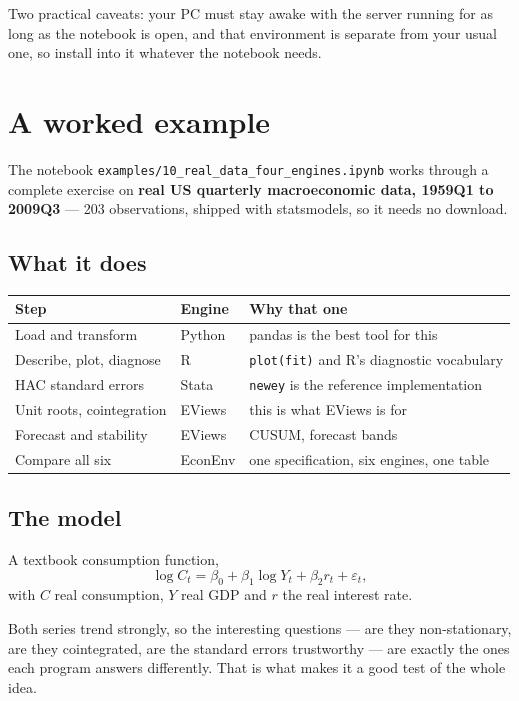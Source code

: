 \documentclass[11pt,a4paper]{report}
\begin{document}
Two practical caveats: your PC must stay awake with the server running for as
long as the notebook is open, and that environment is separate from your usual
one, so install into it whatever the notebook needs.

\chapter{A worked example}

The notebook \texttt{examples/10\_real\_data\_four\_engines.ipynb} works through a
complete exercise on \textbf{real US quarterly macroeconomic data, 1959Q1 to
2009Q3} --- 203 observations, shipped with statsmodels, so it needs no download.

\section{What it does}

\begin{center}
\begin{tabular}{@{}llp{6.2cm}@{}}
\toprule
\textbf{Step} & \textbf{Engine} & \textbf{Why that one} \\
\midrule
Load and transform & Python & pandas is the best tool for this \\
Describe, plot, diagnose & R & \texttt{plot(fit)} and R's diagnostic vocabulary \\
HAC standard errors & Stata & \texttt{newey} is the reference implementation \\
Unit roots, cointegration & EViews & this is what EViews is for \\
Forecast and stability & EViews & CUSUM, forecast bands \\
Compare all six & EconEnv & one specification, six engines, one table \\
\bottomrule
\end{tabular}
\end{center}

\section{The model}

A textbook consumption function,
\[
  \log C_t = \beta_0 + \beta_1 \log Y_t + \beta_2 r_t + \varepsilon_t ,
\]
with $C$ real consumption, $Y$ real GDP and $r$ the real interest rate.

Both series trend strongly, so the interesting questions --- are they
non-stationary, are they cointegrated, are the standard errors trustworthy ---
are exactly the ones each program answers differently. That is what makes it a
good test of the whole idea.
\end{document}
